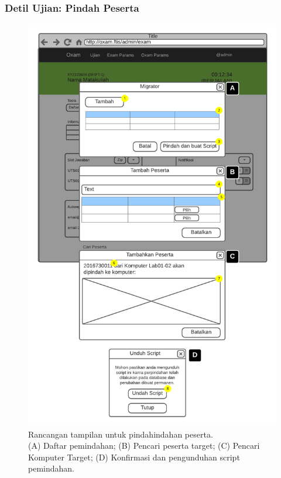 \subsubsection{Detil Ujian: Pindah Peserta}
    \begin{figure}
        \centering
        \includegraphics{Gambar/mockups/Mockup--Admin - Pindah Peserta.pdf}
        \caption{Rancangan tampilan untuk pindahindahan peserta. \\
            (A) Daftar pemindahan; (B) Pencari peserta target; (C) Pencari Komputer Target; (D) Konfirmasi dan
            pengunduhan script pemindahan.}
        \label{fig:mockup_admin_exam_det_migrator}
    \end{figure}

